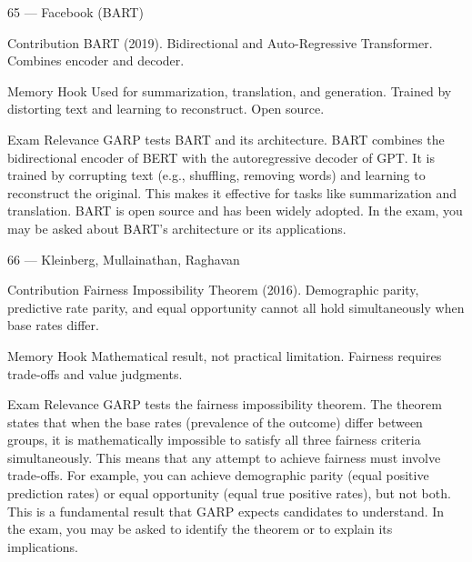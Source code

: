 \documentclass[aspectratio=169,8pt]{beamer}
\begin{document}
	\begin{frame}{65 --- Facebook (BART)}
		\begin{block}{Contribution}
			BART (2019). Bidirectional and Auto-Regressive Transformer. Combines encoder and decoder.
		\end{block}
		\begin{block}{Memory Hook}
			Used for summarization, translation, and generation. Trained by distorting text and learning to reconstruct. Open source.
		\end{block}
		\begin{block}{Exam Relevance}
			GARP tests BART and its architecture. BART combines the bidirectional encoder of BERT with the autoregressive decoder of GPT. It is trained by corrupting text (e.g., shuffling, removing words) and learning to reconstruct the original. This makes it effective for tasks like summarization and translation. BART is open source and has been widely adopted. In the exam, you may be asked about BART's architecture or its applications.
		\end{block}
	\end{frame}
	
	\begin{frame}{66 --- Kleinberg, Mullainathan, Raghavan}
		\begin{block}{Contribution}
			Fairness Impossibility Theorem (2016). Demographic parity, predictive rate parity, and equal opportunity cannot all hold simultaneously when base rates differ.
		\end{block}
		\begin{block}{Memory Hook}
			Mathematical result, not practical limitation. Fairness requires trade-offs and value judgments.
		\end{block}
		\begin{block}{Exam Relevance}
			GARP tests the fairness impossibility theorem. The theorem states that when the base rates (prevalence of the outcome) differ between groups, it is mathematically impossible to satisfy all three fairness criteria simultaneously. This means that any attempt to achieve fairness must involve trade-offs. For example, you can achieve demographic parity (equal positive prediction rates) or equal opportunity (equal true positive rates), but not both. This is a fundamental result that GARP expects candidates to understand. In the exam, you may be asked to identify the theorem or to explain its implications.
		\end{block}
	\end{frame}
	
\end{document}
